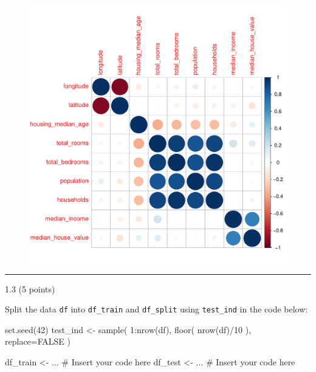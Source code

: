 \documentclass[
  letterpaper,
  DIV=11,
  numbers=noendperiod]{scrartcl}
\newenvironment{Shaded}{\begin{snugshade}}{\end{snugshade}}
\newcommand{\AttributeTok}[1]{\textcolor[rgb]{0.40,0.45,0.13}{#1}}
\newcommand{\CommentTok}[1]{\textcolor[rgb]{0.37,0.37,0.37}{#1}}
\newcommand{\ConstantTok}[1]{\textcolor[rgb]{0.56,0.35,0.01}{#1}}
\newcommand{\DecValTok}[1]{\textcolor[rgb]{0.68,0.00,0.00}{#1}}
\newcommand{\FunctionTok}[1]{\textcolor[rgb]{0.28,0.35,0.67}{#1}}
\newcommand{\NormalTok}[1]{\textcolor[rgb]{0.00,0.23,0.31}{#1}}
\newcommand{\OtherTok}[1]{\textcolor[rgb]{0.00,0.23,0.31}{#1}}
\newcommand{\SpecialCharTok}[1]{\textcolor[rgb]{0.37,0.37,0.37}{#1}}
\begin{document}
\begin{figure}[H]

{\centering \includegraphics{hw5_files/figure-pdf/unnamed-chunk-3-1.pdf}

}

\end{figure}

\begin{center}\rule{0.5\linewidth}{0.5pt}\end{center}

1.3 (5 points)

Split the data \texttt{df} into \texttt{df\_train} and
\texttt{df\_split} using \texttt{test\_ind} in the code below:

\begin{Shaded}
\begin{Highlighting}[]
\FunctionTok{set.seed}\NormalTok{(}\DecValTok{42}\NormalTok{)}
\NormalTok{test\_ind }\OtherTok{\textless{}{-}} \FunctionTok{sample}\NormalTok{(}
  \DecValTok{1}\SpecialCharTok{:}\FunctionTok{nrow}\NormalTok{(df), }
  \FunctionTok{floor}\NormalTok{( }\FunctionTok{nrow}\NormalTok{(df)}\SpecialCharTok{/}\DecValTok{10}\NormalTok{ ),}
  \AttributeTok{replace=}\ConstantTok{FALSE}
\NormalTok{)}

\NormalTok{df\_train }\OtherTok{\textless{}{-}}\NormalTok{ ... }\CommentTok{\# Insert your code here}
\NormalTok{df\_test  }\OtherTok{\textless{}{-}}\NormalTok{ ... }\CommentTok{\# Insert your code here}
\end{Highlighting}
\end{Shaded}
\end{document}

